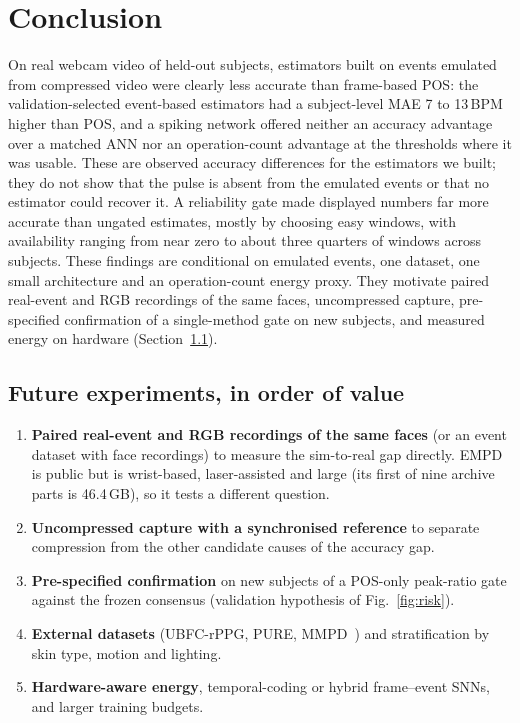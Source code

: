 \documentclass[10pt,journal]{IEEEtran}
\begin{document}
\section{Conclusion}
On real webcam video of held-out subjects, estimators built on events emulated from compressed video were clearly less accurate than frame-based POS: the validation-selected event-based estimators had a subject-level MAE 7 to 13\,BPM higher than POS, and a spiking network offered neither an accuracy advantage over a matched ANN nor an operation-count advantage at the thresholds where it was usable. These are observed accuracy differences for the estimators we built; they do not show that the pulse is absent from the emulated events or that no estimator could recover it. A reliability gate made displayed numbers far more accurate than ungated estimates, mostly by choosing easy windows, with availability ranging from near zero to about three quarters of windows across subjects. These findings are conditional on emulated events, one dataset, one small architecture and an operation-count energy proxy. They motivate paired real-event and RGB recordings of the same faces, uncompressed capture, pre-specified confirmation of a single-method gate on new subjects, and measured energy on hardware (Section~\ref{sec:future}).

\subsection{Future experiments, in order of value}\label{sec:future}
\begin{enumerate}
\item \textbf{Paired real-event and RGB recordings of the same faces} (or an event dataset with face recordings) to measure the sim-to-real gap directly. EMPD~\cite{feng2026empd} is public but is wrist-based, laser-assisted and large (its first of nine archive parts is 46.4\,GB), so it tests a different question.
\item \textbf{Uncompressed capture with a synchronised reference} to separate compression from the other candidate causes of the accuracy gap.
\item \textbf{Pre-specified confirmation} on new subjects of a POS-only peak-ratio gate against the frozen consensus (validation hypothesis of Fig.~\ref{fig:risk}).
\item \textbf{External datasets} (UBFC-rPPG, PURE, MMPD~\cite{tang2023mmpd}) and stratification by skin type, motion and lighting.
\item \textbf{Hardware-aware energy}, temporal-coding or hybrid frame--event SNNs, and larger training budgets.
\end{enumerate}
\end{document}
